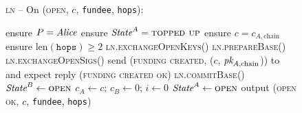 \begin{figure}[H]
  \begin{processbox}{\textsc{ln} -- On (\textsc{open}, $c$, \texttt{fundee},
  \texttt{hops}):}
    \begin{algorithmic}[1]
      \State {}
      \State ensure $P = \mathit{Alice}$ 
       
        \State ensure $\textit{State}^A = \textsc{topped up}$
        \State ensure $c = c_{A, \mathrm{chain}}$
      \Else \: 
        \State ensure $\mathrm{len}(\texttt{hops}) \geq 2$ 
      \EndIf
      \State \textsc{ln.exchangeOpenKeys}()
      \State \textsc{ln.prepareBase}()
        \State \textsc{ln.exchangeOpenSigs}()
      \Else \: 
        \State send (\textsc{funding created}, ($c$, $\textit{pk}_{A, \mathrm{chain}}$))
        to \adversary and expect reply (\textsc{funding created ok})
      \EndIf
        \State \textsc{ln.commitBase}()
       
        \State $\textit{State}^B \gets \textsc{open}$
      \EndIf
      \State $c_A \gets c$; $c_B \gets 0$; $i \gets 0$
      \State $\textit{State}^A \gets \textsc{open}$
      \State output (\textsc{open ok}, $c$, \texttt{fundee}, \texttt{hops})
    \end{algorithmic}
  \end{processbox}
  \caption{}
  \label{code:ln:open}
\end{figure}

